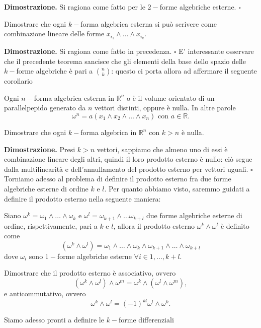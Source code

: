 %
\noindent \textbf{Dimostrazione. }
    Si ragiona come fatto per le $2-$forme algebriche esterne.
\hfill $\square$
%
\vspace{0.5cm}
\begin{exercise}
    Dimostrare che ogni $k-$forma algebrica esterna si può scrivere come combinazione lineare delle forme $x_{i_1} \wedge \ldots \wedge x_{i_k}$.
\end{exercise}
%
\noindent \textbf{Dimostrazione. }
    Si ragiona come fatto in precedenza.
\hfill $\square$
%
E' interessante osservare che il precedente teorema sancisce che gli elementi della base dello spazio delle $k-$forme algebriche è pari a $\binom{n}{k}$: questo ci porta allora ad affermare il seguente corollario
%
\vspace{0.5cm}
\begin{cor}[\textcolor{blue}{le $n-$forme sono volumi di parallelepipedi}]
    Ogni $n-$forma algebrica esterna in $\mathbb{R}^n$ o è il volume orientato di un parallelpepido generato da $n$ vettori distinti, oppure è nulla. In altre parole
    $$
        \omega^n = a (x_1 \wedge x_2 \wedge \ldots \wedge x_n) \text{ con } a \in \mathbb{R}.
    $$
\end{cor}
%
\vspace{0.5cm}
\begin{exercise}
    Dimostrare che ogni $k-$forma algebrica in $\mathbb{R}^n$ con $k > n$ è nulla.
\end{exercise}
%
\noindent \textbf{Dimostrazione. }
    Presi $k > n$ vettori, sappiamo che almeno uno di essi è combinazione lineare degli altri, quindi il loro prodotto esterno è nullo: ciò segue dalla multilinearità e dell'annullamento del prodotto esterno per vettori uguali.
\hfill $\square$
%
Torniamo adesso al problema di definire il prodotto esterno fra due forme algebriche esterne di ordine $k$ e $l$. Per quanto abbiamo visto, saremmo guidati a definire il prodotto esterno nella seguente maniera:
%
\vspace{0.5cm}
\begin{definition}[\textcolor{blue}{prodotto esterno fra una $k-$forma e una $l-$forma}]
    Siano $\omega^k = \omega_1 \wedge \ldots \wedge \omega_k$ e $\omega^l = \omega_{k+1} \wedge \ldots \omega_{k+l}$ due forme algebriche esterne di ordine, rispettivamente, pari a $k$ e $l$, allora il prodotto esterno $\omega^k \wedge \omega^l$ è definito come
    $$
        (\omega^k \wedge \omega^l) =  \omega_1 \wedge \ldots \wedge \omega_k \wedge \omega_{k+1} \wedge \ldots \wedge \omega_{k+l}
    $$
    dove $\omega_i$ sono $1-$forme algebriche esterne $\forall i \in {1, \ldots, k+l}$.
\end{definition}
%
\vspace{0.5cm}
\begin{exercise}
    Dimostrare che il prodotto esterno è associativo, ovvero
    $$
        (\omega^k \wedge \omega^l) \wedge \omega^m = \omega^k \wedge (\omega^l \wedge \omega^m),
    $$
    e anticommutativo, ovvero
    $$
        \omega^k \wedge \omega^l = (-1) ^ {kl} \omega^l \wedge \omega^k.
    $$
\end{exercise}
Siamo adesso pronti a definire le $k-$forme differenziali